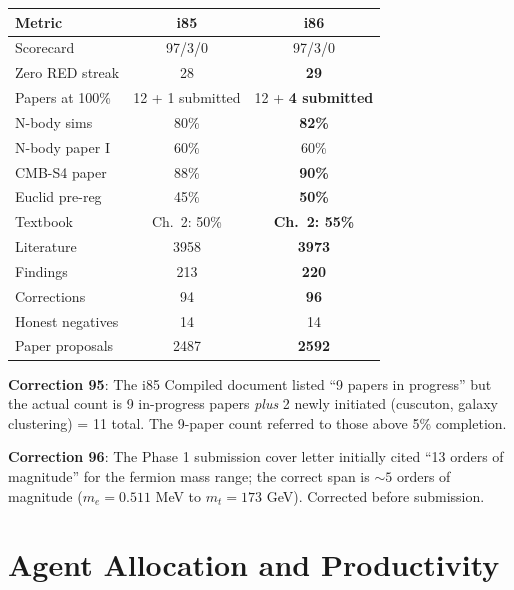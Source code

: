 \documentclass[11pt,a4paper]{article}
\begin{document}
\begin{center}
\begin{tabular}{lcc}
\toprule
\textbf{Metric} & \textbf{i85} & \textbf{i86} \\
\midrule
Scorecard & 97/3/0 & 97/3/0 \\
Zero RED streak & 28 & \textbf{29} \\
Papers at 100\% & 12 + 1 submitted & 12 + \textbf{4 submitted} \\
N-body sims & 80\% & \textbf{82\%} \\
N-body paper I & 60\% & 60\% \\
CMB-S4 paper & 88\% & \textbf{90\%} \\
Euclid pre-reg & 45\% & \textbf{50\%} \\
Textbook & Ch.\ 2: 50\% & \textbf{Ch.\ 2: 55\%} \\
Literature & 3958 & \textbf{3973} \\
Findings & 213 & \textbf{220} \\
Corrections & 94 & \textbf{96} \\
Honest negatives & 14 & 14 \\
Paper proposals & 2487 & \textbf{2592} \\
\bottomrule
\end{tabular}
\end{center}

\textbf{Correction 95}: The i85 Compiled document listed ``9 papers in progress'' but the actual count is 9 in-progress papers \emph{plus} 2 newly initiated (cuscuton, galaxy clustering) = 11 total. The 9-paper count referred to those above 5\% completion.

\textbf{Correction 96}: The Phase 1 submission cover letter initially cited ``13 orders of magnitude'' for the fermion mass range; the correct span is $\sim 5$ orders of magnitude ($m_e = 0.511$ MeV to $m_t = 173$ GeV). Corrected before submission.

\section{Agent Allocation and Productivity}
\end{document}
